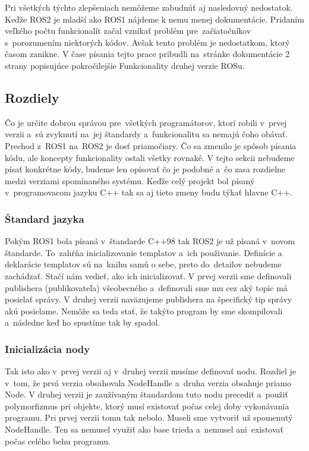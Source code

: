 Pri všetkých týchto zlepšeniach nemôžeme zabudnúť aj nasledovný nedostatok. Keďže ROS2 je mladší ako ROS1 nájdeme k nemu menej dokumentácie.
Pridaním veľkého počtu funkcionalít začal vznikať problém pre~začiatočníkov s~porozumením niektorých kódov. Avšak tento problém je nedostatkom,
ktorý časom zanikne. V čase písania tejto prace pribudli na~stránke dokumentácie 2 strany popisujúce pokročilejšie Funkcionality druhej verzie ROSu.

\subsection{Rozdiely}

Čo je určite dobrou správou pre~všetkých programátorov, ktorí robili v~prvej verzii a~sú zvyknutí na~jej štandardy a~funkcionalitu sa nemajú čoho obávať.
Prechod z~ROS1 na~ROS2 je dosť priamočiary. Čo sa zmenilo je spôsob písania kódu, ale koncepty funkcionality ostali všetky rovnaké. V tejto sekcii nebudeme
písať konkrétne kódy, budeme len opisovať čo je podobné a~čo zasa rozdielne medzi verziami spomínaného systému. Keďže celý projekt bol písaný v~programovacom
jazyku C++ tak sa aj tieto zmeny budu týkať hlavne C++.

\subsubsection{Štandard jazyka}

	Pokým ROS1 bola písaná v~štandarde C++98 tak ROS2 je už písaná v~novom štandarde. To~zahŕňa inicializovanie templatov a~ich použivanie. Definície
	a deklarácie templatov sú na~knihu samú o sebe, preto do~detailov nebudeme zachádzať. Stačí nám vedieť, ako ich inicializovať. V prvej verzii
	sme definovali publishera (publikovateľa) všeobecného a~definovali sme mu cez aký topic má posielať správy. V druhej verzii naväzujeme publishera
	na špecifický tip správy akú posielame. Nemôže sa teda stať, že takýto program by sme skompilovali a~následne keď ho spustíme tak by spadol.

\subsubsection{Inicializácia nody}

	Tak isto ako v~prvej verzii aj v~druhej verzii musíme definovať nodu. Rozdiel je v~tom, že prvá verzia obsahovala NodeHandle a~druha verzia obsahuje priamo Node.
	V druhej verzii je zaužívaným štandardom tuto nodu precediť a~použiť polymorfizmus pri objekte, ktorý musí existovať počas celej doby vykonávania programu. Pri
	prvej verzii tomu tak nebolo. Museli sme vytvoriť už spomenutý NodeHandle. Ten sa nemusel využiť ako base trieda a~nemusel ani~existovať počas celého behu programu.

